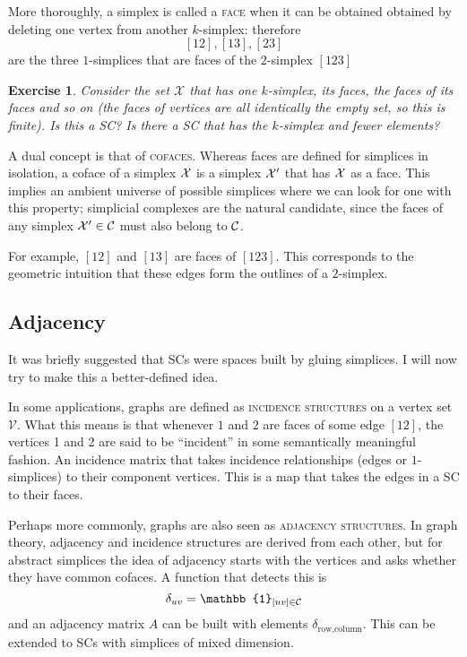 \documentclass{tufte-handout}
\newtheorem{exercise}{Exercise}
\newcommand{\define}{\textsc}
\newcommand{\ve}{\mathcal{V}}
\begin{document}
More thoroughly, a simplex is called a \define{face} when it can be obtained obtained by deleting one vertex from another $k$-simplex: therefore
\[
[12],[13],[23]
\]
are the three $1$-simplices that are faces of the $2$-simplex $[123]$
\begin{exercise}
Consider the set $\mathcal X$ that has one $k$-simplex, its faces, the faces of its faces and so on (the faces of vertices are all identically the empty set, so this is finite). Is this a SC? Is there a SC that has the $k$-simplex and fewer elements?
\end{exercise}

A dual concept is that of \define{cofaces}. Whereas faces are defined for simplices in isolation, a coface of a simplex $\se$ is a simplex $\se'$ that has $\se$ as a face. This implies an ambient universe of possible simplices where we can look for one with this property; simplicial complexes are the natural candidate, since the faces of any simplex $\se'\in \sc$ must also belong to $\sc$. 

For example, $[12]$ and $[13]$ are faces of $[123]$. This corresponds to the geometric intuition that these edges form the outlines of a $2$-simplex.



\subsection{Adjacency}

It was briefly suggested that SCs were spaces built by gluing simplices. I will now try to make this a better-defined idea.

In some applications, graphs are defined as \define{incidence structures} on a vertex set $\ve$. What this means is that whenever $1$ and $2$ are faces of some edge $[12]$, the vertices 1 and 2 are said to be ``incident'' in some semantically meaningful fashion. An incidence matrix that takes incidence relationships (edges or $1$-simplices) to their component vertices. This is a map that takes the edges in a SC to their faces.

Perhaps more commonly, graphs are also seen as \define{adjacency structures}. In graph theory,  adjacency and incidence structures are derived from each other, but for abstract simplices the idea of adjacency starts with the vertices and asks whether they have common cofaces. A function that detects this is
\[
\delta_{uv}=\mathbb{1}_{[uv]\in\sc}
\]
and an adjacency matrix $A$ can be built with elements $\delta_{\text{row},\text{column}}$. This can be extended to SCs with simplices of mixed dimension. 
\end{document}

